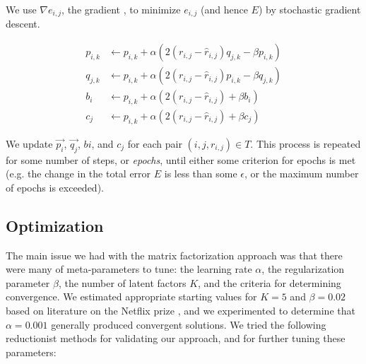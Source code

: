 \documentclass[11pt]{amsart}
\begin{document}
We use $\nabla e_{i,j}$, the gradient , to minimize $e_{i,j}$ (and hence $E$) by stochastic gradient descent.

\begin{align*}
p_{i,k} &\gets p_{i,k} + \alpha \left(2 \left(r_{i,j} - \hat{r}_{i,j}\right)  q_{j,k} - \beta p_{i,k} \right) \\
q_{j,k} &\gets p_{i,k} + \alpha \left(2 \left(r_{i,j} - \hat{r}_{i,j}\right)  p_{i,k} - \beta q_{j,k} \right) \\
b_{i}   &\gets p_{i,k} + \alpha \left(2 \left(r_{i,j} - \hat{r}_{i,j}\right)          + \beta b_{i}   \right) \\
c_{j}   &\gets p_{i,k} + \alpha \left(2 \left(r_{i,j} - \hat{r}_{i,j}\right)          + \beta c_{j}   \right)
\end{align*}

We update $\vec{p_i}$, $\vec{q_j}$, $b{i}$, and $c_{j}$ for each pair $(i, j, r_{i,j}) \in T$. This process is repeated for some number of steps, or \emph{epochs}, until either some criterion for epochs is met (e.g. the change in the total error $E$ is less than some $\epsilon$, or the maximum number of epochs is exceeded). 

\subsection{Optimization}
The main issue we had with the matrix factorization approach was that there were many of meta-parameters to tune: the learning rate $\alpha$, the regularization parameter $\beta$, the number of latent factors $K$, and the criteria for determining convergence. We estimated appropriate starting values for $K = 5$ and $\beta = 0.02$ based on literature on the Netflix prize \cite{Mnih:2007wg,Ott:2008tu}, and we experimented to determine that $\alpha = 0.001$ generally produced convergent solutions. We tried the following reductionist methods for validating our approach, and for further tuning these parameters:
\end{document}
